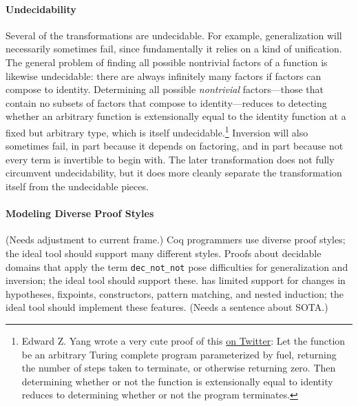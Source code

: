 \paragraph{Undecidability}
Several of the transformations are undecidable.
For example, generalization will necessarily sometimes fail, since fundamentally it relies on a kind of unification.
The general problem of finding all possible nontrivial factors of a function is likewise undecidable:
there are always infinitely many factors if factors can compose to identity.
Determining all possible \textit{nontrivial} factors---those that contain no subsets of factors
that compose to identity---reduces to detecting whether an arbitrary function is extensionally equal
to the identity function at a fixed but arbitrary type,
which is itself undecidable.\footnote{Edward Z. Yang wrote a very cute proof of this \href{https://twitter.com/ezyang/status/1391546552989241346}{on Twitter}: Let the function be an arbitrary Turing complete program parameterized by fuel, returning
the number of steps taken to terminate, or otherwise returning zero.
Then determining whether or not the function is extensionally equal to identity reduces to determining whether or not
the program terminates.}
Inversion will also sometimes fail, in part because it depends on factoring,
and in part because not every term is invertible to begin with.
The later \toolnamec transformation does not fully circumvent undecidability,
but it does more cleanly separate the transformation itself from the undecidable pieces.

\paragraph{Modeling Diverse Proof Styles} (Needs adjustment to current frame.)
Coq programmers use diverse proof styles; the ideal tool should support many different styles.
Proofs about decidable domains that apply the term \lstinline{dec_not_not}
pose difficulties for generalization and inversion; the ideal tool should support these. 
\sysname has limited support for changes in hypotheses, fixpoints, constructors, 
pattern matching, and nested induction; the ideal tool should implement these features.
(Needs a sentence about SOTA.)

